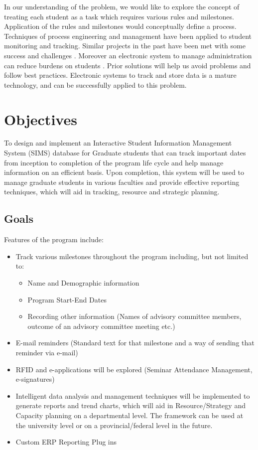 \documentclass{journal}
\begin{document}
In our understanding of the problem, we would like to explore the concept of treating each student as a task which requires various rules and milestones. Application of the rules and milestones would conceptually define a process. Techniques of process engineering and management 
have been applied to student monitoring and tracking. Similar projects in the past have been met with some success and challenges \cite{flex}. 
Moreover an electronic system to manage administration can reduce burdens on students \cite{adv}. Prior solutions will help us avoid problems and follow best practices. 
Electronic systems to track and store data is a mature technology, and can be successfully applied to this problem. 

\section{Objectives}

To design and implement an Interactive Student Information Management System (SIMS) database for Graduate students that can track important dates from inception 
to completion of the program life cycle and help manage information on an efficient basis. Upon completion, this system will be used to manage graduate students 
in various faculties and provide effective reporting techniques, which will aid in tracking, resource and strategic planning.
\subsection{ Goals }
 Features of the program include:
\begin{itemize}
 \item{Track various milestones throughout the program including, but not limited to:}
 \begin{itemize}
   \item{ Name and Demographic information }
   \item{ Program Start-End Dates }
   \item{ Recording other information (Names of advisory committee members, outcome of an advisory committee meeting etc.) }
  \end{itemize}
  \item{ E-mail reminders (Standard text for that milestone and a way of sending that reminder via e-mail) }
  \item{ RFID and e-applications will be explored (Seminar Attendance Management, e-signatures) }
  \item{ Intelligent data analysis and management techniques will be implemented to generate reports and trend charts, which will aid in Resource/Strategy and Capacity planning on a departmental level. The framework can be used at the university level or on a provincial/federal level in the future. } 
  \item{ Custom ERP Reporting Plug ins }
\end{itemize}
\end{document}
